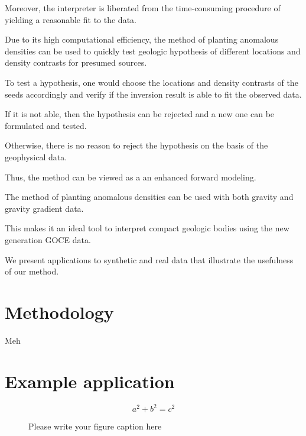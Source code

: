 \documentclass[twocolumn,draft]{svjour3}
\begin{document}
\begin{sloppypar}
Moreover, the interpreter is liberated
from the time-consuming procedure
of yielding a reasonable fit to the data.

Due to its high computational efficiency,
the method of planting anomalous densities
can be used to quickly test geologic hypothesis
of different locations and density contrasts
for presumed sources.

To test a hypothesis,
one would choose
the locations and density contrasts of the seeds accordingly
and verify if the inversion result
is able to fit the observed data.

If it is not able,
then the hypothesis can be rejected
and a new one can be formulated and tested.

Otherwise, there is no reason to reject the hypothesis
on the basis of the geophysical data.

Thus, the method can be viewed as a an enhanced forward modeling.

The method of planting anomalous densities
can be used with both gravity and gravity gradient data.

This makes it an ideal tool
to interpret compact geologic bodies
using the new generation GOCE data.

We present  applications to synthetic and real data
that illustrate the usefulness of our method.

\end{sloppypar}

\section{Methodology}

Meh

\section{Example application}


\begin{equation}
a^2+b^2=c^2
\end{equation}

\begin{figure}
\caption{Please write your figure caption here}
\label{fig:1}       %
\end{figure}
\end{document}
